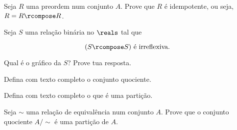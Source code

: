 \begin{exercise}
Seja $R$ uma preordem num conjunto $A$. Prove que $R$ é idempotente, ou seja, $R = R \rcompose R$.
\end{exercise}

\begin{exercise}
Seja $S$ uma relação binária no $\reals$ tal que

$$
    (S \rcompose S) \text{ é irreflexiva}.
$$

Qual é o gráfico da $S$? Prove tua resposta.
\end{exercise}

\begin{exercise}
Defina com texto completo o conjunto quociente.
\end{exercise} 

\begin{exercise}
Defina com texto completo o que é uma partição.
\end{exercise} 

\begin{exercise}
Seja $\sim$ uma relação de equivalência num conjunto $A$. Prove que o conjunto quociente $A/\sim$ é uma partição de $A$. 
\end{exercise} 
